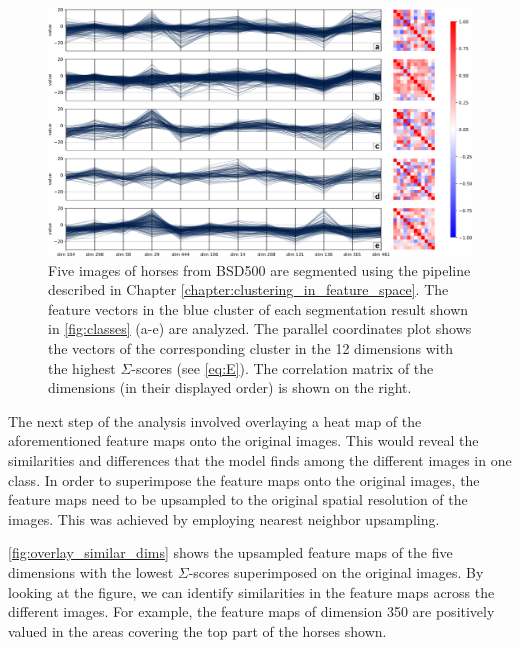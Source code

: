 \begin{figure}
    \centering
    \includegraphics[width=\textheight]{figures/PCP_dissimilar.png}
    \caption{Five images of horses from BSD500 are segmented using the pipeline described in Chapter \ref{chapter:clustering_in_feature_space}. The feature vectors in the blue cluster of each segmentation result shown in \autoref{fig:classes} (a-e) are analyzed. The parallel coordinates plot shows the vectors of the corresponding cluster in the 12 dimensions with the highest $\Sigma$-scores (see \autoref{eq:E}). The correlation matrix of the dimensions (in their displayed order) is shown on the right.}
    \label{fig:pcp_dissimilar}
\end{figure}

The next step of the analysis involved overlaying a heat map of the aforementioned feature maps onto the original images. This would reveal the similarities and differences that the model finds among the different images in one class. In order to superimpose the feature maps onto the original images, the feature maps need to be upsampled to the original spatial resolution of the images. This was achieved by employing nearest neighbor upsampling.


\autoref{fig:overlay_similar_dims} shows the upsampled feature maps of the five dimensions with the lowest $\Sigma$-scores superimposed on the original images. By looking at the figure, we can identify similarities in the feature maps across the different images. For example, the feature maps of dimension 350 are positively valued in the areas covering the top part of the horses shown.

